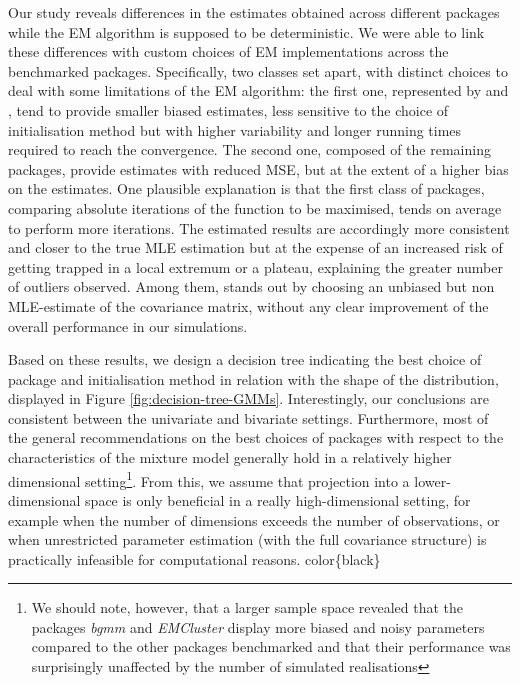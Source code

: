 Our study reveals differences in the estimates obtained across different packages while the EM algorithm is supposed to be deterministic. We were able to link these differences with custom choices of EM implementations across the benchmarked packages.
Specifically, two classes set apart, with distinct choices to deal with some limitations of the EM algorithm: the first
one, represented by  and , tend to provide
smaller biased estimates, less sensitive to the choice of initialisation
method but with higher variability and longer running times required to reach the convergence. The second one, composed of the remaining
packages, provide estimates with reduced MSE, but at the extent of a
higher bias on the estimates. One plausible explanation is that the first class of packages, comparing absolute iterations of the function to be maximised, tends on average to perform more iterations. The estimated results are accordingly more consistent and closer to the true MLE estimation but at the expense of an increased risk of getting trapped in a local extremum or a plateau, explaining the greater number of outliers observed. Among them,  stands out by choosing
an unbiased but non MLE-estimate of the covariance matrix, without any clear improvement
of the overall performance in our simulations.

Based on these results, we design a decision tree indicating the best choice of package and initialisation method in relation with the shape of the distribution, displayed in Figure \ref{fig:decision-tree-GMMs}. Interestingly, our conclusions are consistent between the univariate and bivariate settings. \color{blue} Furthermore, most of the general recommendations on the best choices of packages with respect to the characteristics of the mixture model generally hold in a relatively higher dimensional setting\footnote{We should note, however, that a larger sample space revealed that the packages \textit{bgmm} and \textit{EMCluster} display more biased and noisy parameters compared to the other packages benchmarked and that their performance was surprisingly unaffected by the number of simulated realisations}. From this, we assume that projection into a lower-dimensional space is only beneficial in a really high-dimensional setting, for example when the number of dimensions exceeds the number of observations, or when unrestricted parameter estimation (with the full covariance structure) is practically infeasible for computational reasons.
color\{black\}

